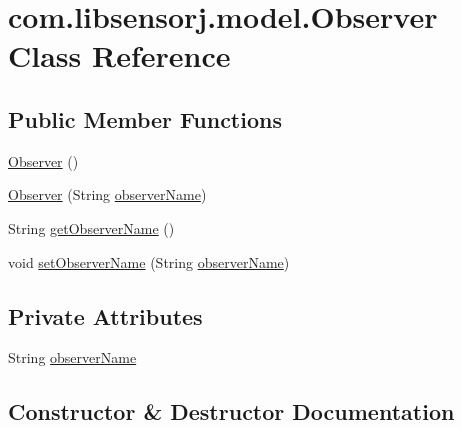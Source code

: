 \hypertarget{classcom_1_1libsensorj_1_1model_1_1Observer}{}\section{com.\+libsensorj.\+model.\+Observer Class Reference}
\label{classcom_1_1libsensorj_1_1model_1_1Observer}
\subsection*{Public Member Functions}
\begin{DoxyCompactItemize}
\item 
\hyperlink{classcom_1_1libsensorj_1_1model_1_1Observer_a477725e32a58d3a8762d404799ec0161}{Observer} ()
\item 
\hyperlink{classcom_1_1libsensorj_1_1model_1_1Observer_a4933adee4c8da771eaa94415f6f840a7}{Observer} (String \hyperlink{classcom_1_1libsensorj_1_1model_1_1Observer_aa1f9da7634c35f34d5f20d5bc1562428}{observer\+Name})
\item 
String \hyperlink{classcom_1_1libsensorj_1_1model_1_1Observer_a8b873b9c90ad7f1ed055ea6713e0062a}{get\+Observer\+Name} ()
\item 
void \hyperlink{classcom_1_1libsensorj_1_1model_1_1Observer_a42628ca2b4d99e0df9fe1d70fec811b2}{set\+Observer\+Name} (String \hyperlink{classcom_1_1libsensorj_1_1model_1_1Observer_aa1f9da7634c35f34d5f20d5bc1562428}{observer\+Name})
\end{DoxyCompactItemize}
\subsection*{Private Attributes}
\begin{DoxyCompactItemize}
\item 
String \hyperlink{classcom_1_1libsensorj_1_1model_1_1Observer_aa1f9da7634c35f34d5f20d5bc1562428}{observer\+Name}
\end{DoxyCompactItemize}


\subsection{Constructor \& Destructor Documentation}
\hypertarget{classcom_1_1libsensorj_1_1model_1_1Observer_a477725e32a58d3a8762d404799ec0161}{}
